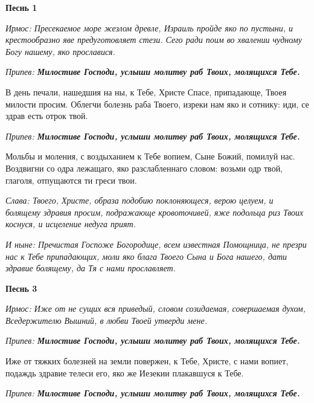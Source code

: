 


 

 


\bfseries Песнь 1\normalfont{}


\itshape Ирмос: \normalfont{}Пресекаемое море жезлом древле, Израиль пройде яко по пустыни, и крестообразно яве предуготовляет стези. Сего ради поим во хвалении чудному Богу нашему, яко прославися.

\itshape Припев: \normalfont{}\bfseries Милостиве Господи, услыши молитву раб Твоих, молящихся Тебе.

\normalfont{}В день печали, нашедшия на ны, к Тебе, Христе Спасе, припадающе, Твоея милости просим. Облегчи болезнь раба Твоего, изреки нам яко и сотнику: иди, се здрав есть отрок твой.

\itshape Припев: \normalfont{}\bfseries Милостиве Господи, услыши молитву раб Твоих, молящихся Тебе.

\normalfont{}Мольбы и моления, с воздыханием к Тебе вопием, Сыне Божий, помилуй нас. Воздвигни со одра лежащаго, яко разслабленнаго словом: возьми одр твой, глаголя, отпущаются ти греси твои.

\itshape Слава: \normalfont{}Твоего, Христе, образа подобию поклоняющеся, верою целуем, и болящему здравия просим, подражающе кровоточивей, яже подольца риз Твоих коснуся, и исцеление недуга прият.

\itshape И ныне: \normalfont{}Пречистая Госпоже Богородице, всем известная Помощница, не презри нас к Тебе припадающих, моли яко блага Твоего Сына и Бога нашего, дати здравие болящему, да Тя с нами прославляет.


\medskip


\bfseries Песнь 3\normalfont{}


\itshape Ирмос: \normalfont{}Иже от не сущих вся приведый, словом созидаемая, совершаемая духом, Вседержителю Вышний, в любви Твоей утверди мене.

\itshape Припев: \normalfont{}\bfseries Милостиве Господи, услыши молитву раб Твоих, молящихся Тебе.\normalfont{}

Иже от тяжких болезней на земли повержен, к Тебе, Христе, с нами вопиет, подаждь здравие телеси его, яко же Иезекии плакавшуся к Тебе.

\itshape Припев: \normalfont{}\bfseries Милостиве Господи, услыши молитву раб Твоих, молящихся Тебе.\normalfont{}

